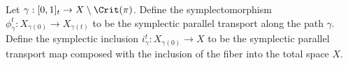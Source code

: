 

        Let $\gamma:[0,1]_t\to X\setminus \Crit(\pi)$.
        Define the symplectomorphism $\phi_\gamma^t: X_{\gamma(0)}\to X_{\gamma(t)}$ to be the symplectic parallel transport along the path $\gamma$. 
        Define the symplectic inclusion $i_\gamma^t: X_{\gamma(0)}\to X$ to be the symplectic parallel transport map composed with the inclusion of the fiber into the total space $X$.

